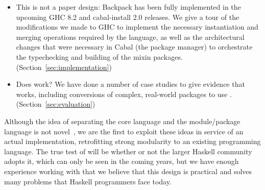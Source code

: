 \begin{itemize}
    \item This is not a paper design: Backpack has been fully
    implemented in the upcoming GHC 8.2 and cabal-install 2.0 releases.
    We give a tour of the modifications we made to GHC to
    implement the necessary instantiation and merging operations
    required by the \unit{} language, as well as the architectural
    changes that were necessary in Cabal (the package manager)
    to orchestrate the typechecking and building of the mixin
    packages. (Section~\ref{sec:implementation})

    \item Does \Backpack{} work?
    We have done a number of case studies to give evidence
    that \Backpack{} works, including conversions of complex,
    real-world packages to use \Backpack{}. (Section~\ref{sec:evaluation})


\end{itemize}
%
Although the idea of separating the core language and the module/package
language is not novel~\cite{leroy:modular,milner+:def-of-sml-revised,rossberg+:f-ing}, we are the first to exploit these ideas in service
of an actual implementation, retrofitting strong modularity to an existing
programming language.  The true test of \Backpack{} will be whether or not
the larger Haskell community adopts it, which can only be seen in the
coming years, but we have enough experience working with \Backpack{}
that we believe that this design is practical and solves many problems
that Haskell programmers face today.




